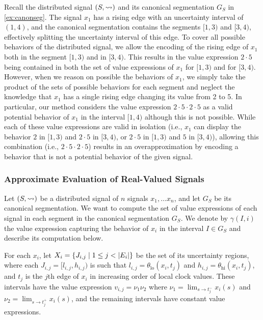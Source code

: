 \begin{example}
	Recall the distributed signal $(S, {\rightsquigarrow})$ and its canonical segmentation $G_S$ in \cref{ex:canonseg}.
	The signal $x_1$ has a rising edge with an uncertainty interval of $(1,4)$, and the canonical segmentation contains the segments $[1,3)$ and $[3,4)$, effectively splitting the uncertainty interval of this edge.
	To cover all possible behaviors of the distributed signal, we allow the encoding of the rising edge of $x_1$ both in the segment $[1,3)$ and in $[3,4)$.
	This results in the value expression $2 \cdot 5$ being contained in both the set of value expressions of $x_1$ for $[1,3)$ and for $[3,4)$.
	However, when we reason on possible the behaviors of $x_1$, we simply take the product of the sets of possible behaviors for each segment and neglect the knowledge that $x_1$ has a single rising edge changing its value from 2 to 5.
	In particular, our method considers the value expression $2 \cdot 5 \cdot 2 \cdot 5$ as a valid potential behavior of $x_1$ in the interval $[1,4)$ although this is not possible.
	While each of these value expressions are valid in isolation (i.e., $x_1$ 
	can display the behavior $2$ in $[1,3)$ and $2 \cdot 5$ in $[3,4)$, or $2 
	\cdot 5$ in $[1,3)$ and $5$ in $[3,4)$), allowing this combination (i.e., 
	$2 \cdot 5 \cdot 2 \cdot 5$) results in an overapproximation by encoding 
	a behavior that is not a potential behavior of the given signal.
\end{example}

\subsubsection{Approximate Evaluation of Real-Valued Signals}

Let $(S,{\rightsquigarrow})$ be a distributed signal of $n$ signals $x_1, \ldots x_n$, and let $G_S$ be its canonical segmentation.
We want to compute the set of value expressions of each signal in each segment in the canonical segmentation $G_S$.
We denote by $\gamma(I, i)$ the value expression capturing the behavior of $x_i$ in the interval $I \in G_S$ and describe its computation below.

For each $x_i$, let $X_i = \{ J_{i,j} \st 1 \leq j < |E_i| \}$ be the set of its uncertainty regions, where each $J_{i,j} = [l_{i,j}, h_{i,j})$ is such that $l_{i,j} = \theta_{\text{lo}}(x_i, t_j)$ and $h_{i,j} = \theta_{\text{hi}}(x_i, t_j)$, and $t_j$ is the $j$th edge of $x_i$ in increasing order of local clock values.
These intervals have the value expression $v_{i,j} = \nu_1 \nu_2$ where $\nu_1 = \lim_{s \to t_j^-} x_i(s)$ and $\nu_2 = \lim_{s \to t_j^+} x_i(s)$, and the remaining intervals have constant value expressions.


